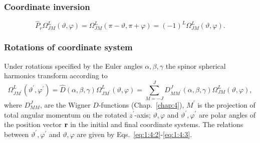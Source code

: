 \subsubsection{Coordinate inversion}
\begin{equation}
\hat{P}_{r} \Omega_{J M}^{L}(\vartheta, \varphi)=\Omega_{J M}^{L}(\pi-\vartheta, \pi+\varphi)=(-1)^{L} \Omega_{J M}^{L}(\vartheta, \varphi) . \label{eq:7:2:21}
\end{equation}
\subsubsection{Rotations of coordinate system}

Under rotations specified by the Euler angles $\alpha, \beta, \gamma$ the spinor spherical harmonics transform according to
\begin{equation}
\Omega_{J M^{\prime}}^{L}\left(\vartheta^{\prime}, \varphi^{\prime}\right)=\hat{D}(\alpha, \beta, \gamma) \Omega_{J M^{\prime}}^{L}(\vartheta, \varphi)=\sum_{M=-J}^{J} D_{M M^{\prime}}^{J}(\alpha, \beta, \gamma) \Omega_{J M}^{L}(\vartheta, \varphi), \label{eq:7:2:22}
\end{equation}
where $D_{M M}^{J}$, are the Wigner $D$-functions (Chap.~\ref{chap:4}), $M^{\prime}$ is the projection of total angular momentum on the rotated $z^{\prime}$-axis; $\vartheta, \varphi$ and $\vartheta^{\prime}, \varphi^{\prime}$ are polar angles of the position vector $\mathbf{r}$ in the initial and final coordinate systems. The relations between $\vartheta^{\prime}, \varphi^{\prime}$ and $\vartheta, \varphi$ are given by Eqs.~\eqref{eq:1:4:2}-\eqref{eq:1:4:3}.

